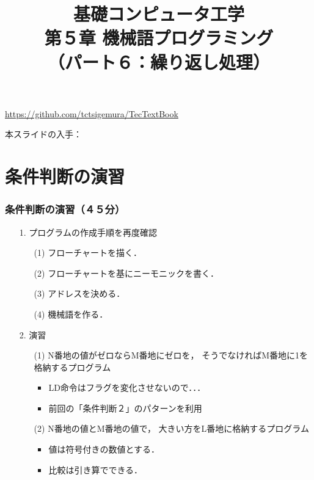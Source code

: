\documentclass[handout]{beamer}        %
\begin{document}
\title{基礎コンピュータ工学\\第５章 機械語プログラミング\\
       （パート６：繰り返し処理）}
\date{}

\begin{frame}
  \titlepage
  \centerline{\url{https://github.com/tctsigemura/TecTextBook}}
  \vfill
  \centerline{本スライドの入手：
    }
\end{frame}


\section{条件判断の演習}
\begin{frame}
  \frametitle{条件判断の演習（４５分）}
  \begin{enumerate}
  \item[1.] プログラムの作成手順を再度確認
    \begin{enumerate}
    \item[(1)] フローチャートを描く．
    \item[(2)] フローチャートを基にニーモニックを書く．
    \item[(3)] アドレスを決める．
    \item[(4)] 機械語を作る．
    \end{enumerate}
    \vfill
  \item[2.] 演習
    \begin{enumerate}
    \item[(1)] N番地の値がゼロならM番地にゼロを，
      そうでなければM番地に1を格納するプログラム
      \begin{itemize}
      \item LD命令はフラグを変化させないので．．．
      \item 前回の「条件判断２」のパターンを利用
      \end{itemize}
      \vfill
    \item[(2)] N番地の値とM番地の値で，
      大きい方をL番地に格納するプログラム
      \begin{itemize}
      \item 値は符号付きの数値とする．
      \item 比較は引き算でできる．
      \end{itemize}
    \end{enumerate}
  \end{enumerate}
  \vfill
\end{frame}
\end{document}
